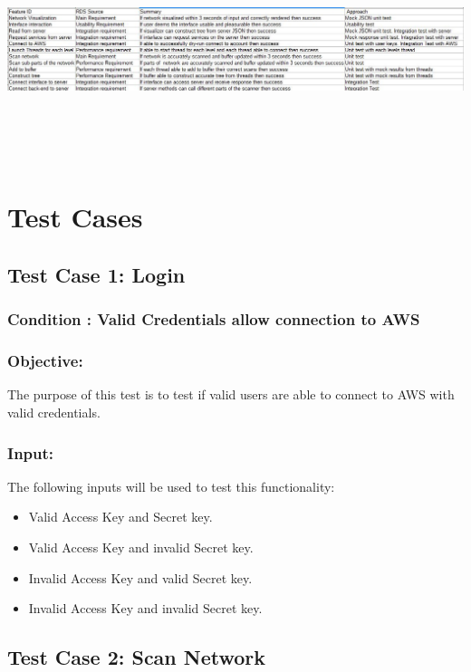 \documentclass[hidelinks,a4paper,12pt]{article}
\begin{document}
\includegraphics[width=17.3cm,height=6.5cm]{./images/table.jpg}

 \section{Test Cases}
\subsection{Test Case 1: Login}
\subsubsection{Condition : Valid Credentials allow connection to AWS}
\subsubsection{Objective:} The purpose of this test is to test if valid users are able to connect to AWS with valid credentials.

\subsubsection{Input:}
 The following inputs will be used to test this functionality:
\begin{itemize}
  \item Valid Access Key and Secret key.
  \item Valid Access Key and invalid Secret key.
 \item Invalid Access Key and valid Secret key.
 \item Invalid Access Key and invalid Secret key.
\end{itemize}

\subsection{Test Case 2: Scan Network }
\end{document}
